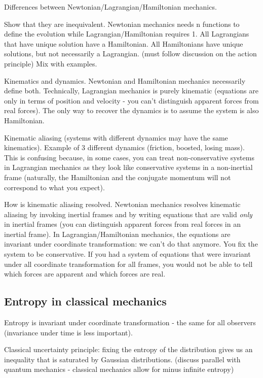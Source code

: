 \documentclass{article}
\begin{document}
Differences between Newtonian/Lagrangian/Hamiltonian mechanics.

Show that they are inequivalent. Newtonian mechanics needs n functions to define the evolution while Lagrangian/Hamiltonian requires 1. All Lagrangians that have unique solution have a Hamiltonian. All Hamiltonians have unique solutions, but not necessarily a Lagrangian. (must follow discussion on the action principle) Mix with examples.

Kinematics and dynamics. Newtonian and Hamiltonian mechanics necessarily define both. Technically, Lagrangian mechanics is purely kinematic (equations are only in terms of position and velocity - you can't distinguish apparent forces from real forces). The only way to recover the dynamics is to assume the system is also Hamiltonian.

Kinematic aliasing (systems with different dynamics may have the same kinematics). Example of 3 different dynamics (friction, boosted, losing mass). This is confusing because, in some cases, you can treat non-conservative systems in Lagrangian mechanics as they look like conservative systems in a non-inertial frame (naturally, the Hamiltonian and the conjugate momentum will not correspond to what you expect).

How is kinematic aliasing resolved. Newtonian mechanics resolves kinematic aliasing by invoking inertial frames and by writing equations that are valid \emph{only} in inertial frames (you can distinguish apparent forces from real forces in an inertial frame).  In Lagrangian/Hamiltonian mechanics, the equations are invariant under coordinate transformation: we can't do that anymore. You fix the system to be conservative. If you had a system of equations that were invariant under all coordinate transformation for all frames, you would not be able to tell which forces are apparent and which forces are real.

\subsection{Entropy in classical mechanics}

Entropy is invariant under coordinate transformation - the same for all observers (invariance under time is less important).

Classical uncertainty principle: fixing the entropy of the distribution gives us an inequality that is saturated by Gaussian distributions. (discuss parallel with quantum mechanics - classical mechanics allow for minus infinite entropy)
\end{document}
